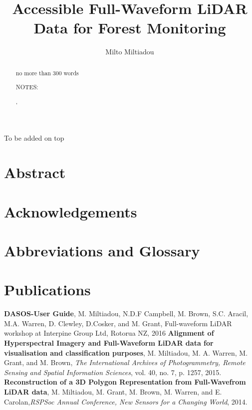 \documentclass[11pt,nofootinbib]{report}
\title{Accessible Full-Waveform LiDAR Data for Forest Monitoring}
\author{Milto Miltiadou}
\begin{document}
	\maketitle
 		
\begin{abstract}	
     no more than 300 words
     
     NOTES:
     \par {\color{blue}{Blue colour: additions according to Neill's feedback}},
     \par {\color{red}{Red colour: notes}}
     \par {\color{gray}{Gray colour: text that is going to be modified }}
     
     \thispagestyle{empty}
\end{abstract}

\newpage
\thispagestyle{empty}
	\setcounter{secnumdepth}{0}
	To be added on top
	\section{Abstract}\label{Abstract}
		
		\thispagestyle{empty}
		\newpage
	\section{Acknowledgements}\label{Acknowledgments}
		
		\thispagestyle{empty}
		\newpage
	

	\section {Abbreviations and Glossary}\label{Abbreviations}
	
	\newpage
	\section{Publications}
		\textbf{DASOS-User Guide}, M. Miltiadou, N.D.F Campbell, M. Brown, S.C. Aracil, M.A. Warren, D. Clewley, D.Cosker, and M. Grant, Full-waveform LiDAR workshop at Interpine Group Ltd, Rotorua NZ, 2016\newline
		\textbf{Alignment of Hyperspectral Imagery and Full-Waveform LiDAR data for visualisation and classification purposes}, M. Miltiadou, M. A. Warren, M. Grant, and M. Brown, \textit{The International Archives of Photogrammetry, Remote Sensing and Spatial Information Sciences}, vol. 40, no. 7, p. 1257, 2015.\newline
		\textbf{Reconstruction of a 3D Polygon Representation from Full-Wavefrom LiDAR data}, M. Miltiadou, M. Grant, M. Brown, M. Warren, and E. Carolan,\textit{RSPSoc Annual Conference, New Sensors for a Changing World}, 2014.\newline
	 
\end{document}
